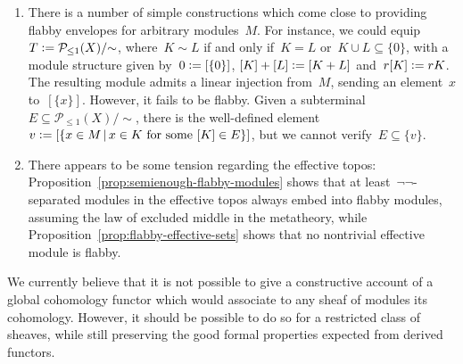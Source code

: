 \documentclass[oneside]{amsart}
\theoremstyle{definition}
\theoremstyle{plain}
\theoremstyle{remark}
\renewcommand{\P}{\mathcal{P}}
\newcommand{\defeq}{\vcentcolon=}
\renewcommand{\_}{\mathpunct{.}\,}
\begin{document}
\begin{enumerate}
However, it is an open question under which circumstances quotient inductive
types can be shown to exist. Zermelo--Fraenkel with choice certainly suffices,
while Zermelo--Fraenkel without choice doesn't~\cite[Section~9]{shulman-lumsdaine:hits},\footnote{With
quotient inductive types, any infinitary algebraic theory admits free algebras.
However, it is consistent with Zermelo--Fraenkel set theory that some such
theories don't admit free algebras~\cite{blass:free-algebras}.} hence IZF also
doesn't. Quotient inductive types seem to be, as the existence of enough
injective modules, \emph{constructively neutral}.

\item There is a number of simple constructions which come close to providing
flabby envelopes for arbitrary modules~$M$. For instance, we could equip~$T
\defeq \P_{\leq1}(X)/{\sim}$, where~$K \sim L$ if and only if~$K = L$ or~$K
\cup L \subseteq \{0\}$, with a module structure given by~$0 \defeq [\{0\}]$,
$[K]+[L] \defeq [K+L]$ and~$r [K] \defeq rK$. The resulting module admits a
linear injection from~$M$, sending an element~$x$ to~$[\{x\}]$. However, it
fails to be flabby. Given a subterminal~$E \subseteq \P_{\leq1}(X)/{\sim}$,
there is the well-defined element~$v \defeq [\{x \in M\,|\,\text{$x \in K$ for
some~$[K] \in E$}\}]$, but we cannot verify~$E \subseteq \{v\}$.

\item There appears to be some tension regarding the effective topos:
Proposition~\ref{prop:semienough-flabby-modules} shows that at
least~$\neg\neg$-separated modules in the effective topos always embed into
flabby modules, assuming the law of excluded middle in the metatheory, while
Proposition~\ref{prop:flabby-effective-sets} shows that no nontrivial effective
module is flabby.
\end{enumerate}

We currently believe that it is not possible to give a constructive account of
a global cohomology functor which would associate to any sheaf of modules its
cohomology. However, it should be possible to do so for a restricted class of
sheaves, while still preserving the good formal properties expected from
derived functors.

\printbibliography
\end{document}
